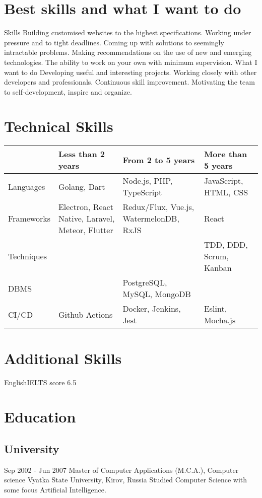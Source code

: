 \documentclass[11pt,a4paper]{moderncv}
\begin{document}
\maketitle
\section{Best skills and what I want to do}
  \cvline
    {Skills}{
      Building customised websites to the highest specifications.
      Working under pressure and to tight deadlines.
      Coming up with solutions to seemingly intractable problems.
      Making recommendations on the use of new and emerging technologies.
      The ability to work on your own with minimum supervision.}
  \cvline
    {What I want to do}{
      Developing useful and interesting projects.
      Working closely with other developers and professionals.
      Continuous skill improvement.
      Motivating the team to self-development, inspire and organize.}

\section{Technical Skills}

\begin{tabular}{ l||m{4cm}|m{4cm}|m{4cm}|  }
  & Less than 2 years & From 2 to 5 years & More than 5 years \\
  \hline\hline
  Languages & Golang, Dart & Node.js, PHP, TypeScript & JavaScript, HTML, CSS \\
  \hline
  Frameworks & Electron, React Native, Laravel, Meteor, Flutter & Redux/Flux, Vue.js, WatermelonDB, RxJS & React \\
  \hline
  Techniques & & & TDD, DDD, Scrum, Kanban \\
  \hline
  DBMS & & PostgreSQL, MySQL, MongoDB & \\
  \hline
  CI/CD & Github Actions & Docker, Jenkins, Jest & Eslint, Mocha.js \\
  \hline
\end{tabular}

\section{Additional Skills}
  \cvline
    {English}{IELTS score 6.5}

\section{Education}
  \subsection{University}
  \cventry
    {Sep 2002 - Jun 2007}
    {Master of Computer Applications (M.C.A.), Computer science}
    {\newline Vyatka State University, Kirov, Russia}
    {}{}
    {Studied Computer Science with some focus Artificial Intelligence.}
\end{document}
